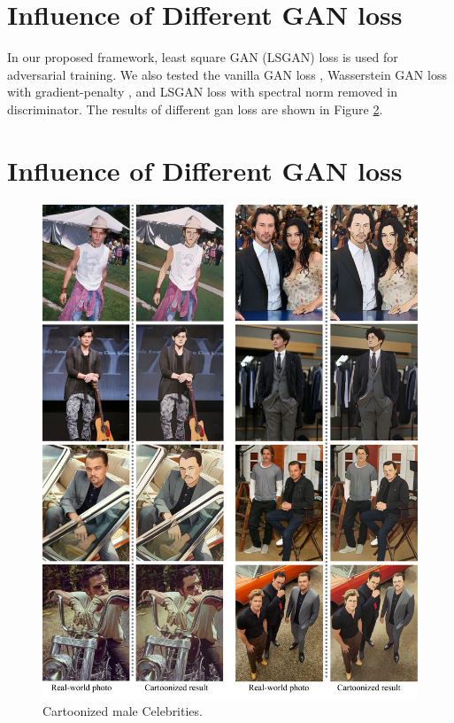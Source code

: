 \documentclass[10pt,twocolumn,letterpaper]{article}
\begin{document}
\section{Influence of Different GAN loss}
In our proposed framework, least square GAN (LSGAN) loss \cite{mao2017least} is used for adversarial training. We also tested the vanilla GAN loss \cite{goodfellow2014generative}, Wasserstein GAN loss with gradient-penalty \cite{gulrajani2017improved}, and LSGAN loss with spectral norm removed in discriminator. The results of different gan loss are shown in Figure \ref{}.

\section{Influence of Different GAN loss}

\begin{figure}[b]
\vspace{-0.5em}
\centering
\includegraphics[width=\linewidth]{figures/person1.pdf}
\caption{Cartoonized male Celebrities.}
\label{fig:person1}
\vspace{-0.5em}
\end{figure}
\end{document}
